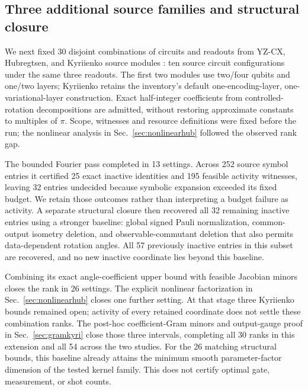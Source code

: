 \subsection{Three additional source families and structural closure}
\label{sec:extension}
We next fixed 30 disjoint combinations of circuits and readouts from YZ-CX,
Hubregtsen, and Kyriienko source modules
\cite{squlearn,hubregtsen2022,kyriienko2021}: ten source circuit
configurations under the same three readouts. The first two modules
use two/four qubits and one/two layers; Kyriienko retains the inventory's
default one-encoding-layer, one-variational-layer construction.
Exact half-integer coefficients from controlled-rotation decompositions
are admitted, without restoring approximate constants to multiples of
$\pi$. Scope, witnesses and resource definitions were fixed before the
run; the nonlinear analysis in Sec.~\ref{sec:nonlinearhub} followed
the observed rank gap.

The bounded Fourier pass completed in 13 settings. Across 252 source
symbol entries it certified 25 exact inactive identities and 195
feasible activity witnesses, leaving 32 entries undecided because
symbolic expansion exceeded its fixed budget. We retain those outcomes
rather than interpreting a budget failure as activity. A separate
structural closure then recovered all 32 remaining inactive entries
using a stronger baseline: global signed Pauli normalization,
common-output isometry deletion, and observable-commutant deletion
that also permits data-dependent rotation angles. All 57 previously
inactive entries in this subset are recovered, and no new inactive
coordinate lies beyond this baseline.

Combining its exact angle-coefficient upper bound with feasible
Jacobian minors closes the rank in 26 settings. The explicit nonlinear
factorization in Sec.~\ref{sec:nonlinearhub} closes one further setting.
At that stage three Kyriienko bounds remained open; activity of every
retained coordinate does not settle these combination ranks. The
post-hoc coefficient-Gram minors and output-gauge proof in
Sec.~\ref{sec:gramkyri} close those three intervals, completing all
30 ranks in this extension and all 54 across the two studies.
For the 26 matching structural bounds, this baseline already attains
the minimum smooth parameter-factor dimension of the tested kernel
family. This does not certify optimal gate, measurement, or shot counts.

